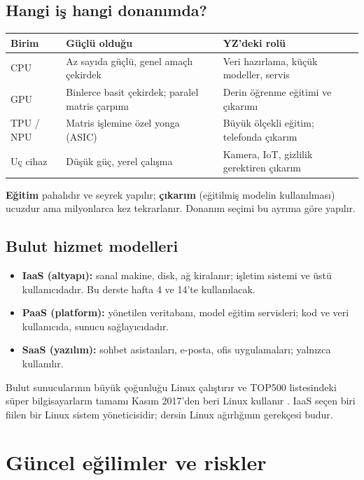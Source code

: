 \documentclass[11pt,a4paper]{article}
\begin{document}
\subsection{Hangi iş hangi donanımda?}
\begin{center}
\begin{tabularx}{\textwidth}{@{}l Y Y@{}}
\toprule
\textbf{Birim} & \textbf{Güçlü olduğu} & \textbf{YZ'deki rolü} \\
\midrule
CPU & Az sayıda güçlü, genel amaçlı çekirdek & Veri hazırlama, küçük modeller, servis \\
GPU & Binlerce basit çekirdek; paralel matris çarpımı & Derin öğrenme eğitimi ve çıkarımı \\
TPU / NPU & Matris işlemine özel yonga (ASIC) & Büyük ölçekli eğitim; telefonda çıkarım \\
Uç cihaz & Düşük güç, yerel çalışma & Kamera, IoT, gizlilik gerektiren çıkarım \\
\bottomrule
\end{tabularx}
\end{center}
\textbf{Eğitim} pahalıdır ve seyrek yapılır; \textbf{çıkarım} (eğitilmiş modelin kullanılması) ucuzdur ama milyonlarca kez tekrarlanır. Donanım seçimi bu ayrıma göre yapılır.

\subsection{Bulut hizmet modelleri}
\begin{itemize}
  \item \textbf{IaaS (altyapı):} sanal makine, disk, ağ kiralanır; işletim sistemi ve üstü kullanıcıdadır. Bu derste hafta 4 ve 14'te kullanılacak.
  \item \textbf{PaaS (platform):} yönetilen veritabanı, model eğitim servisleri; kod ve veri kullanıcıda, sunucu sağlayıcıdadır.
  \item \textbf{SaaS (yazılım):} sohbet asistanları, e-posta, ofis uygulamaları; yalnızca kullanılır.
\end{itemize}
Bulut sunucularının büyük çoğunluğu Linux çalıştırır ve TOP500 listesindeki süper bilgisayarların tamamı Kasım 2017'den beri Linux kullanır \cite{top500}. IaaS seçen biri fiilen bir Linux sistem yöneticisidir; dersin Linux ağırlığının gerekçesi budur.

\section{Güncel eğilimler ve riskler}
\end{document}
